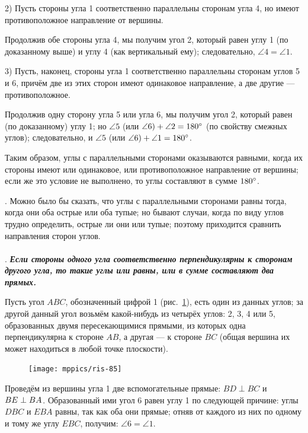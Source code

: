 \documentclass[oneside]{book}
\begin{document}
2) Пусть стороны угла 1 соответственно параллельны сторонам угла 4, но имеют противоположное направление от вершины.

Продолжив обе стороны угла 4, мы получим угол 2, который равен углу 1 (по доказанному выше) и углу 4 (как вертикальный ему);
следовательно, $\angle 4 = \angle 1$.

3) Пусть, наконец, стороны угла 1 соответственно параллельны сторонам углов 5 и 6, причём две из этих сторон имеют одинаковое направление, а две другие — противоположное.

Продолжив одну сторону угла 5 или угла 6, мы получим угол 2, который равен (по доказанному) углу 1;
но $\angle 5$ (или $\angle 6) +\angle 2 \z= 180\degree$ (по свойству смежных углов);
следовательно, и $\angle 5$ (или $\angle 6) \z+ \angle 1 \z= 180\degree$.

Таким образом, углы с параллельными сторонами оказываются равными, когда их стороны имеют или одинаковое, или противоположное направление от вершины;
если же это условие не выполнено, то углы составляют в сумме $180\degree$.

\smallskip
{}.
Можно было бы сказать, что углы с параллельными сторонами равны тогда, когда они оба острые или оба тупые;
но бывают случаи, когда по виду углов трудно определить, острые ли они или тупые;
поэтому приходится сравнить направления сторон углов.

\paragraph{}\label{1938/80}
.
\textbf{\emph{Если стороны одного угла соответственно перпендикулярны к сторонам другого угла, то такие углы или равны, или в сумме составляют два прямых.}}

Пусть угол $ABC$, обозначенный цифрой 1 (рис.~\ref{1938/ris-85}), есть один из данных углов;
за другой данный угол возьмём какой-нибудь из четырёх углов:
2, 3, 4 или 5, образованных двумя пересекающимися прямыми, из которых одна перпендикулярна к стороне $AB$, а другая — к стороне $BC$ (общая вершина их может находиться в любой точке плоскости).

\begin{figure}
\centering
\texttt{[image: mppics/ris-85]}
\caption{}\label{1938/ris-85}
\end{figure}

Проведём из вершины угла 1 две вспомогательные прямые:
$BD\perp BC$ и $BE\z\perp BA$.
Образованный ими угол 6 равен углу 1 по следующей причине:
углы $DBC$ и $EBA$ равны, так как оба они прямые;
отняв от каждого из них по одному и тому же углу $EBC$, получим: $\angle 6 = \angle 1$.
\end{document}
